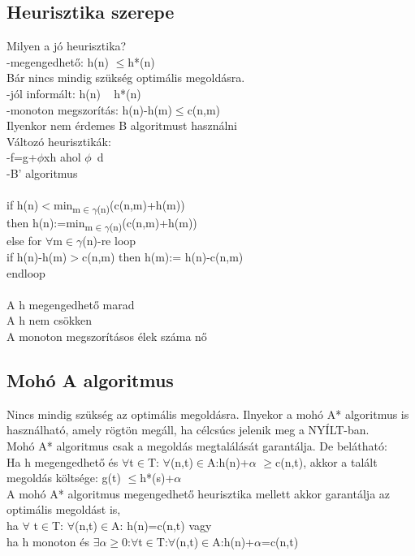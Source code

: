 \documentclass{article}
\begin{document}
	 \subsection{Heurisztika szerepe}
	 Milyen a jó heurisztika?\\
	 -megengedhető: h(n) $\leq$h*(n)\\
	 \hspace*{1em} Bár nincs mindig szükség optimális megoldásra.\\
	 -jól informált: h(n) ~ h*(n)\\
	 -monoton megszorítás: h(n)-h(m)$\leq$c(n,m)\\
	 \hspace*{1em} Ilyenkor nem érdemes B algoritmust használni\\
	 Változó heurisztikák:\\
	 -f=g+$\phi$xh ahol $\phi$~d\\
	 -B' algoritmus\\ \\
	 if h(n)$<$min\textsubscript{m$\in$$\gamma$(n)}(c(n,m)+h(m))\\
	 then h(n):=min\textsubscript{m$\in$$\gamma$(n)}(c(n,m)+h(m))\\
	 else for $\forall$m$\in$$\gamma$(n)-re loop\\
	 \hspace*{1em} if h(n)-h(m)$>$c(n,m) then h(m):= h(n)-c(n,m)\\
	 \hspace*{1em} endloop\\ \\
	 A h megengedhető marad\\
	 A h nem csökken\\
	 A monoton megszorításos élek száma nő\\
	 
	 \newpage
	 \subsection{Mohó A algoritmus}
	 Nincs mindig szükség az optimális megoldásra. Ilnyekor a mohó A* algoritmus is használható, amely rögtön megáll, ha célcsúcs jelenik meg a NYÍLT-ban.\\
	 Mohó A* algoritmus csak a megoldás megtalálását garantálja. De belátható:\\
	 Ha h megengedhető és $\forall$t$\in$T: $\forall$(n,t)$\in$A:h(n)+$\alpha$ $\geq$c(n,t), akkor a talált megoldás költsége: g(t) $\leq$h*(s)+$\alpha$\\
	 A mohó A* algoritmus megengedhető heurisztika mellett akkor garantálja az optimális megoldást is,\\
	 ha $\forall$ t$\in$T: $\forall$(n,t)$\in$A: h(n)=c(n,t) vagy\\
	 ha h monoton és $\exists$$\alpha$$\geq$0:$\forall$t$\in$T:$\forall$(n,t)$\in$A:h(n)+$\alpha$=c(n,t)
	 
\end{document}

